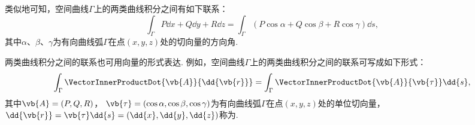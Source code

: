 类似地可知，空间曲线\(\Gamma\)上的两类曲线积分之间有如下联系：
\begin{equation}\label{equation:线积分与面积分.空间曲线上两类曲线积分之间的联系}
	\int_\Gamma P\dd{x}+Q\dd{y}+R\dd{z}
	=\int_\Gamma (P\cos\alpha+Q\cos\beta+R\cos\gamma)\dd{s},
\end{equation}
其中\(\alpha\)、\(\beta\)、\(\gamma\)为有向曲线弧\(\Gamma\)在点\((x,y,z)\)处的切向量的方向角.

两类曲线积分之间的联系也可用向量的形式表达.
例如，空间曲线\(\Gamma\)上的两类曲线积分之间的联系可写成如下形式：
\begin{equation}\label{equation:线积分与面积分.空间曲线上两类曲线积分之间的联系的向量形式}
	\int_\Gamma \VectorInnerProductDot{\vb{A}}{\dd{\vb{r}}}
	= \int_\Gamma \VectorInnerProductDot{\vb{A}}{\vb{\tau}} \dd{s},
\end{equation}
其中\(\vb{A}=(P,Q,R)\)，
\(\vb{\tau}=(\cos\alpha,\cos\beta,\cos\gamma)\)为有向曲线弧\(\Gamma\)在点\((x,y,z)\)处的单位切向量，
\(\dd{\vb{r}}
=\vb{\tau}\dd{s}
=(\dd{x},\dd{y},\dd{z})\)称为.
